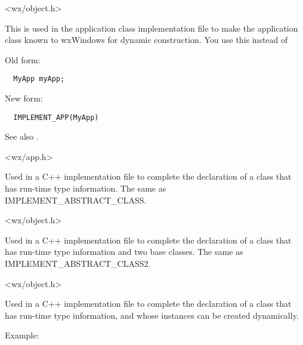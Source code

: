 
<wx/object.h>

\label{implementapp}


This is used in the application class implementation file to make the application class known to
wxWindows for dynamic construction. You use this instead of

Old form:

\begin{verbatim}
  MyApp myApp;
\end{verbatim}

New form:

\begin{verbatim}
  IMPLEMENT_APP(MyApp)
\end{verbatim}

See also .


<wx/app.h>

\label{implementclass}


Used in a C++ implementation file to complete the declaration of
a class that has run-time type information. The same as IMPLEMENT\_ABSTRACT\_CLASS.


<wx/object.h>

\label{implementclass2}


Used in a C++ implementation file to complete the declaration of a
class that has run-time type information and two base classes. The
same as IMPLEMENT\_ABSTRACT\_CLASS2.


<wx/object.h>

\label{implementdynamicclass}


Used in a C++ implementation file to complete the declaration of
a class that has run-time type information, and whose instances
can be created dynamically.

Example:

